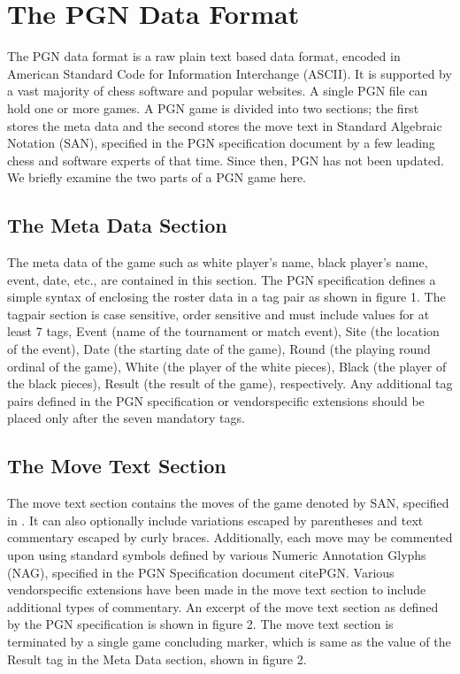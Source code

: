 \documentclass[conference]{IEEEtran}
\begin{document}
\section{The PGN Data Format}
The PGN data format is a raw plain text based data format, encoded in American Standard Code for Information Interchange (ASCII). It is supported by a vast majority of chess software and popular websites. A single PGN file can hold one or more games. A PGN game is divided into two sections; the first stores the meta data and the second stores the move text in Standard Algebraic Notation (SAN), specified in the PGN specification document \cite{ab01} by a few leading chess and software experts of that time. Since then, PGN has not been updated. We briefly examine the two parts of a PGN game here.


\subsection{The Meta Data Section}
The meta data of the game such as white player's name, black player's name, event, date, etc., are contained in this section. The PGN specification defines a simple syntax of enclosing the roster data in a tag pair as shown in figure 1. The tag\textendash pair section is case sensitive, order sensitive and must include values for at least 7 tags, Event (name of the tournament or match event), Site (the location of the event), Date (the starting date of the game), Round (the playing round ordinal of the game), White (the player of the white pieces), Black (the player of the black pieces), Result (the result of the game), respectively. Any additional tag pairs defined in the PGN specification or vendor\textendash specific extensions should be placed only after the seven mandatory tags.


\subsection{The Move Text Section}
The move text section contains the moves of the game denoted by SAN, specified in \cite{ab01}. It can also optionally include variations escaped by parentheses and text commentary escaped by curly braces. Additionally, each move may be commented upon using standard symbols defined by various Numeric Annotation Glyphs (NAG), specified in the PGN Specification document cite{PGN}. Various vendor\textendash specific extensions have been made in the move text section to include additional types of commentary. An excerpt of the move text section as defined by the PGN specification is shown in figure 2. The move text section is terminated by a single game concluding marker, which is same as the value of the Result tag in the Meta Data section, shown in figure 2.
\end{document}
